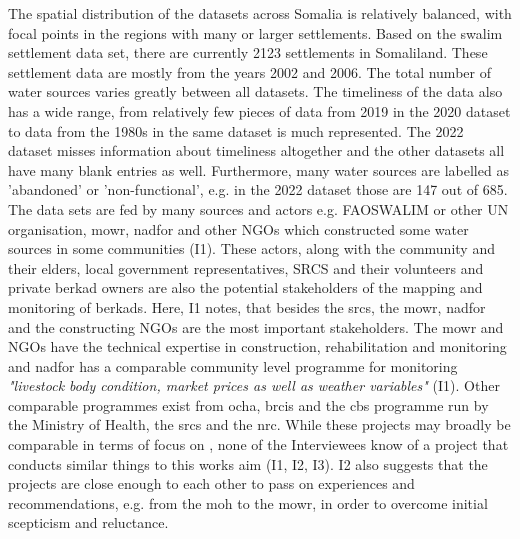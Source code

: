 The spatial distribution of the datasets across Somalia is relatively balanced, with focal points in the regions with many or larger settlements. Based on the \acrshort{swalim} settlement data set, there are currently 2123 settlements in Somaliland. These settlement data are mostly from the years 2002 and 2006. The total number of water sources varies greatly between all datasets. The timeliness of the data also has a wide range, from relatively few pieces of data from 2019 in the 2020 dataset to data from the 1980s in the same dataset is much represented. The 2022 dataset misses information about timeliness altogether and the other datasets all have many blank entries as well. Furthermore, many water sources are labelled as 'abandoned' or 'non-functional', e.g. in the 2022 dataset those are 147 out of 685.\newline
The data sets are fed by many sources and actors e.g. FAOSWALIM or other UN organisation, \acrshort*{mowr}, \acrshort*{nadfor} and other NGOs which constructed some water sources in some communities (I1). These actors, along with the community and their elders, local government representatives, SRCS and their volunteers and private berkad owners are also the potential stakeholders of the mapping and monitoring of berkads. Here, I1 notes, that besides the \acrshort*{srcs}, the \acrshort*{mowr}, \acrshort*{nadfor} and the constructing NGOs are the most important stakeholders. The \acrshort*{mowr} and NGOs have the technical expertise in construction, rehabilitation and monitoring and \acrshort*{nadfor} has a comparable community level programme for monitoring \textit{"livestock body condition, market prices as well as weather variables"} (I1).\newline
Other comparable programmes exist from \acrshort*{ocha}, \acrshort*{brcis} and the \acrshort*{cbs} programme run by the Ministry of Health, the \acrshort{srcs} and the \acrshort*{nrc}. While these projects may broadly be comparable in terms of focus on , none of the Interviewees know of a project that conducts similar things to this works aim (I1, I2, I3). I2 also suggests that the projects are close enough to each other to pass on experiences and recommendations, e.g. from the \acrshort{moh} to the \acrshort{mowr}, in order to overcome initial scepticism and reluctance.\newline
